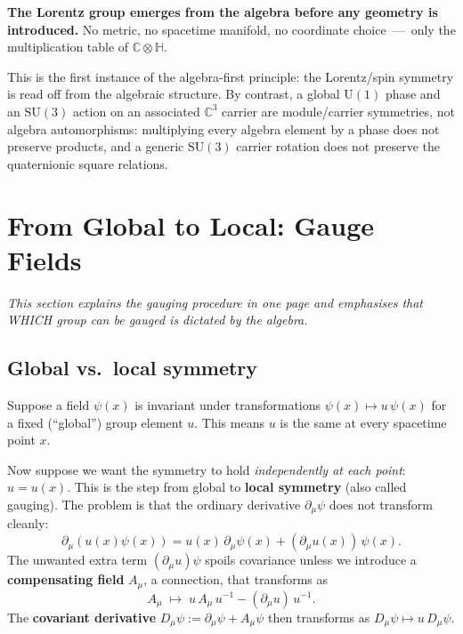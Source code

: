 \documentclass[12pt,a4paper]{article}
\theoremstyle{definition}
\theoremstyle{remark}
\begin{document}
\begin{keybox}
  \textbf{The Lorentz group emerges from the algebra before any geometry is
  introduced.}  No metric, no spacetime manifold, no coordinate choice~---~only
  the multiplication table of $\mathbb{C}\otimes\mathbb{H}$.
\end{keybox}

This is the first instance of the algebra-first principle: the Lorentz/spin
symmetry is read off from the algebraic structure.  By contrast, a global
$\mathrm{U}(1)$ phase and an $\mathrm{SU}(3)$ action on an associated
$\mathbb{C}^3$ carrier are module/carrier symmetries, not algebra
automorphisms: multiplying every algebra element by a phase does not preserve
products, and a generic $\mathrm{SU}(3)$ carrier rotation does not preserve the
quaternionic square relations.

\section{From Global to Local: Gauge Fields}
\label{sec:gauging}

\textit{This section explains the gauging procedure in one page and emphasises
that WHICH group can be gauged is dictated by the algebra.}

\subsection{Global vs.\ local symmetry}

Suppose a field $\psi(x)$ is invariant under transformations
$\psi(x)\mapsto u\,\psi(x)$ for a fixed (``global'') group element $u$.
This means $u$ is the same at every spacetime point $x$.

Now suppose we want the symmetry to hold \emph{independently at each
point}: $u = u(x)$.  This is the step from global to \textbf{local symmetry}
(also called gauging).  The problem is that the ordinary derivative
$\partial_\mu\psi$ does not transform cleanly:
\begin{equation}
  \partial_\mu (u(x)\psi(x))
  = u(x)\,\partial_\mu\psi(x)
    + (\partial_\mu u(x))\,\psi(x).
\end{equation}
The unwanted extra term $(\partial_\mu u)\psi$ spoils covariance unless we
introduce a \textbf{compensating field} $A_\mu$, a connection, that transforms
as
\begin{equation}
  A_\mu \;\mapsto\; u\,A_\mu\,u^{-1} - (\partial_\mu u)\,u^{-1}.
\end{equation}
The \textbf{covariant derivative}
$D_\mu\psi := \partial_\mu\psi + A_\mu\psi$
then transforms as $D_\mu\psi\mapsto u\,D_\mu\psi$.
\end{document}
